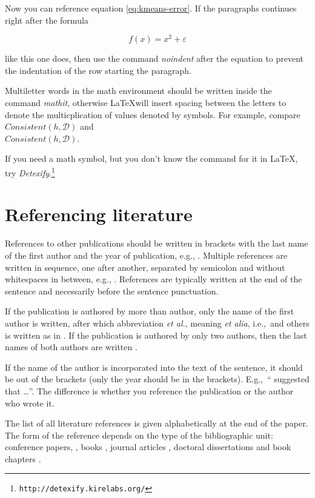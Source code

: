 \documentclass[10pt, a4paper]{article}
\begin{document}
Now you can reference equation \eqref{eq:kmeans-error}. If the paragraphs continues right after the formula

\begin{equation}
f(x) = x^2 + \varepsilon
\end{equation}

\noindent like this one does, then use the command \emph{noindent} after the equation to prevent the indentation of the row starting the paragraph. 

Multiletter words in the math environment should be written inside the command \emph{mathit}, otherwise \LaTeX will insert spacing between the letters to denote the multicplication of values denoted by symbols. For example, compare
$\mathit{Consistent}(h,\mathcal{D})$ and\\
$Consistent(h,\mathcal{D})$.

If you need a math symbol, but you don't know the command for it in \LaTeX, try
\emph{Detexify}.\footnote{\texttt{http://detexify.kirelabs.org/}}

\section{Referencing literature}

References to other publications should be written in brackets with the last name of the first author and the year of publication, e.g., \citep{chomsky-73}.  Multiple references are written in sequence, one after another, separated by semicolon and without whitespaces in between, e.g., \citep{chomsky-73,chave-64,feigl-58}. References are typically written at the end of the sentence and necessarily before the sentence punctuation.

If the publication is authored by more than author, only the name of the first author is written, after which abbreviation \emph{et al.}, meaning \emph{et alia}, i.e.,~and others is written as in \citep{johnson-etc}. If the publication is authored by only two authors, then the last names of both authors are written \citep{johnson-howells}.

If the name of the author is incorporated into the text of the sentence, it should be out of the brackets (only the year should be in the brackets). E.g.,~``\citet{chomsky-73}
suggested that \dots''. The difference is whether you reference the publication or the author who wrote it. 

The list of all literature references is given alphabetically at the end of the paper. The form of the reference depends on the type of the bibliographic unit: conference papers,
\citep{chave-64}, books \citep{butcher-81}, journal articles
\citep{howells-51}, doctoral dissertations \citep{croft-78} and book chapters \citep{feigl-58}. 
\end{document}
